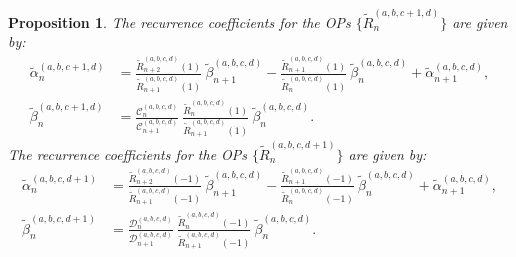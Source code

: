 \documentclass[11pt, oneside]{article}   	%
\newcommand{\genjac}{R}
\newcommand{\genjact}{\tilde{\genjac}}
\newtheorem{proposition}{Proposition}
\begin{document}
\begin{proposition}
The recurrence coefficients for the OPs $\{\genjact_n^{(a,b,c+1,d)}\}$ are given by:
\begin{align}
	\tilde{\alpha}_n^{(a,b,c+1,d)} &= \frac{\genjact_{n+2}^{(a,b,c,d)}(1)}{\genjact_{n+1}^{(a,b,c,d)}(1)} \: \tilde{\beta}_{n+1}^{(a,b,c,d)} - \frac{\genjact_{n+1}^{(a,b,c,d)}(1)}{\genjact_{n}^{(a,b,c,d)}(1)} \: \tilde{\beta}_{n}^{(a,b,c,d)} + \tilde{\alpha}_{n+1}^{(a,b,c,d)}, \\
	\tilde{\beta}_n^{(a,b,c+1,d)} &= \frac{\mathcal{C}_n^{(a,b,c,d)}}{\mathcal{C}_{n+1}^{(a,b,c,d)}} \: \frac{\genjact_{n}^{(a,b,c,d)}(1)}{\genjact_{n+1}^{(a,b,c,d)}(1)} \: \tilde{\beta}_n^{(a,b,c,d)}.
\end{align}
The recurrence coefficients for the OPs $\{\genjact_n^{(a,b,c,d+1)}\}$ are given by:
\begin{align}
	\tilde{\alpha}_n^{(a,b,c,d+1)} &= \frac{\genjact_{n+2}^{(a,b,c,d)}(-1)}{\genjact_{n+1}^{(a,b,c,d)}(-1)} \: \tilde{\beta}_{n+1}^{(a,b,c,d)} - \frac{\genjact_{n+1}^{(a,b,c,d)}(-1)}{\genjact_{n}^{(a,b,c,d)}(-1)} \: \tilde{\beta}_{n}^{(a,b,c,d)} + \tilde{\alpha}_{n+1}^{(a,b,c,d)}, \\
	\tilde{\beta}_n^{(a,b,c,d+1)} &= \frac{\mathcal{D}_n^{(a,b,c,d)}}{\mathcal{D}_{n+1}^{(a,b,c,d)}} \: \frac{\genjact_{n}^{(a,b,c,d)}(-1)}{\genjact_{n+1}^{(a,b,c,d)}(-1)} \: \tilde{\beta}_n^{(a,b,c,d)}.
\end{align}
\end{proposition}
\end{document}
